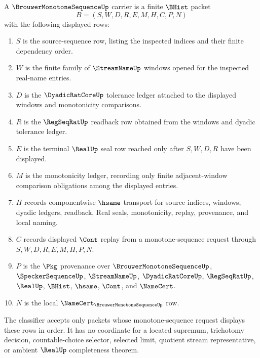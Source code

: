 \begin{definition}
\label{def:brouwer-monotone-sequence-carrier}
A $\BrouwerMonotoneSequenceUp$ carrier is a finite $\BHist$ packet
$$
B=(S,W,D,R,E,M,H,C,P,N)
$$
with the following displayed rows:
\begin{enumerate}
\item $S$ is the source-sequence row, listing the inspected indices and their finite dependency order.
\item $W$ is the finite family of $\StreamNameUp$ windows opened for the inspected real-name entries.
\item $D$ is the $\DyadicRatCoreUp$ tolerance ledger attached to the displayed windows and monotonicity comparisons.
\item $R$ is the $\RegSeqRatUp$ readback row obtained from the windows and dyadic tolerance ledger.
\item $E$ is the terminal $\RealUp$ seal row reached only after $S,W,D,R$ have been displayed.
\item $M$ is the monotonicity ledger, recording only finite adjacent-window comparison obligations among the displayed entries.
\item $H$ records componentwise $\hsame$ transport for source indices, windows, dyadic ledgers, readback, Real seals, monotonicity, replay, provenance, and local naming.
\item $C$ records displayed $\Cont$ replay from a monotone-sequence request through $S,W,D,R,E,M,H,P,N$.
\item $P$ is the $\Pkg$ provenance over $\BrouwerMonotoneSequenceUp$, $\SpeckerSequenceUp$, $\StreamNameUp$, $\DyadicRatCoreUp$, $\RegSeqRatUp$, $\RealUp$, $\BHist$, $\hsame$, $\Cont$, and $\NameCert$.
\item $N$ is the local $\NameCert_{\BrouwerMonotoneSequenceUp}$ row.
\end{enumerate}
The classifier accepts only packets whose monotone-sequence request displays these rows in order. It has no coordinate for a located supremum, trichotomy decision, countable-choice selector, selected limit, quotient stream representative, or ambient $\RealUp$ completeness theorem.
\end{definition}

